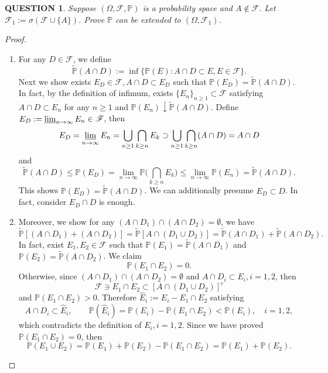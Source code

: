 \documentclass[12pt]{article}
\renewcommand{\(}{\left(}%
\renewcommand{\)}{\right)}%
\renewcommand{\[}{\left[}%
\renewcommand{\]}{\right]}%
\newcommand{\p}{\mathbb{P}}
\newcommand{\f}{\mathscr{F}}
\newtheorem{question}{QUESTION}[section]}
\newtheorem{proof}{Proof.}}
\begin{document}
  \begin{question}
   	Suppose $(\Omega,\f,\p)$ is a probability space and $A\notin\f$. Let $\f_1:=\sigma(\f\cup\{A\})$. Prove $\p$ can be extended to $(\Omega,\f_1)$.
   \end{question}
   \begin{proof}
   	\begin{enumerate}
   		\item For any $D\in\f$, we define
   	\begin{equation*}
   		\widetilde{\p}(A\cap D):=\inf\{\p(E):A\cap D\subset E,E\in\f\}.
   	\end{equation*}
   	 Next we show exists $E_D\in\f,A\cap D\subset E_D$ such that $\p(E_D)=\widetilde{\p}(A\cap D)$. In fact, by the definition of infimum, exists $\{E_n\}_{n\geq 1}\subset\f$ satisfying $A\cap D\subset E_n$ for any $n\geq 1$ and $\p(E_n)\downarrow \widetilde{\p}(A\cap D)$. Define $E_D:=\varliminf_{n\to\infty} E_n\in\f$, then 
   	 \begin{equation*}
   	 	E_D=\varliminf_{n\to\infty} E_n=\bigcup_{n\geq 1}\bigcap_{k\geq n}E_k\supset \bigcup_{n\geq 1}\bigcap_{k\geq n} (A\cap D)=A\cap D
   	 \end{equation*}
   	 and
   	 \begin{equation*}
   	 	\widetilde{\p}(A\cap D)\leq \p(E_D)=\lim_{n\to\infty}\p\bigg(\bigcap_{k\geq n}E_k \bigg)\leq \lim_{n\to\infty}\p(E_n)=\widetilde{\p}(A\cap D).
   	 \end{equation*}
   	 This shows $\p(E_D)=\widetilde{\p}(A\cap D)$. We can additionally presume $E_D\subset D$. In fact, consider $E_D\cap D$ is enough.
   		\item Moreover, we show for any $(A\cap D_1)\cap (A\cap D_2)=\emptyset$, we have 
   	 \begin{equation*}
   	 	\widetilde{\p}[(A\cap D_1)+(A\cap D_2)]=\widetilde{\p}[A\cap (D_1\cup D_2)]=\widetilde{\p}(A\cap D_1)+\widetilde{\p}(A\cap D_2).
   	 \end{equation*}
   	 In fact, exist $E_1,E_2\in\f$ such that $\p(E_1)=\widetilde{\p}(A\cap D_1)$ and $\p(E_2)=\widetilde{\p}(A\cap D_2)$. 
   	 We claim 
   	 \begin{equation*}
   	 	\p(E_1\cap E_2)=0.
   	 \end{equation*}
   	  Otherwise, since $(A\cap D_1)\cap(A\cap D_2)=\emptyset$ and $A\cap D_i\subset E_i,i=1,2$, then 
   	  \begin{equation*}
   	  	\f\ni E_1\cap E_2\subset [A\cap (D_1\cup D_2)]^c
   	  \end{equation*}
   	  and $\p(E_1\cap E_2)>0$. Therefore $\hat{ E}_i:=E_i-E_1\cap E_2$ satisfying 
   	  \begin{equation*}
   	  	A\cap D_i\subset \hat{ E}_i,\qquad\p(\hat{ E}_i)=\p (E_i)-\p(E_1\cap E_2)<\p(E_i),\quad i=1,2,
   	  \end{equation*}
   	  which contradicts the definition of $E_i,i=1,2$. Since we have proved $\p(E_1\cap E_2)=0$, then
   	  \begin{equation*}
   	  	\p(E_1\cup E_2)=\p(E_1)+\p(E_2)-\p(E_1\cap E_2)=\p(E_1)+\p(E_2).
   	  \end{equation*}
   	  

\end{enumerate}
\end{proof}
\end{document}
